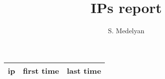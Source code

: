 \documentclass {article}
\author {S. Medelyan}
\title {IPs report}
\begin{document}
\maketitle
\begin {tabular} {|c|c|c|}
\hline
ip & first time & last time \\
\hline
\end {tabular}
\end{document}
